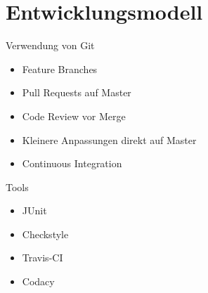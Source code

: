 \documentclass[xcolor=dvipsnames]{beamer}
\begin{document}
\section{Entwicklungsmodell}
\begin{frame}{Verwendung von Git}
    \begin{itemize}
        \item Feature Branches
        \item Pull Requests auf Master
        \item Code Review vor Merge
        \item Kleinere Anpassungen direkt auf Master
        \item Continuous Integration
    \end{itemize}
\end{frame}

\begin{frame}{Tools}
    \begin{itemize}
        \item JUnit
        \item Checkstyle
        \item Travis-CI
        \item Codacy
    \end{itemize}
\end{frame}
\end{document}
